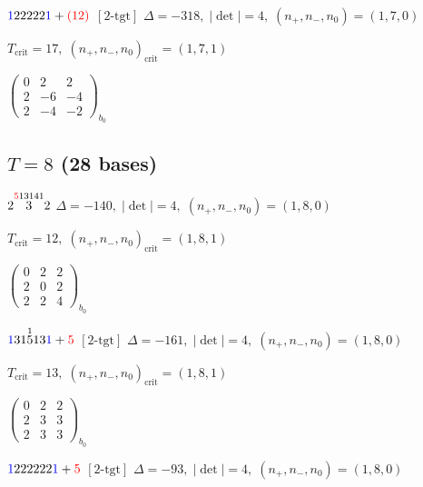 \documentclass[10pt]{article}
\begin{document}
$\textcolor{blue}{1}22222\textcolor{blue}{1}+\textcolor{red}{(12)}$ $\scriptstyle [2\text{-tgt}]$ \quad $\Delta=-318,\; |\det|=4,\; (n_+,n_-,n_0)=(1,7,0)$

\hspace{1em}$T_{\text{crit}}=17,\; (n_+,n_-,n_0)_{\text{crit}}=(1,7,1)$

\hspace{2em}$\left(\begin{smallmatrix}0 & 2 & 2 \\ 2 & -6 & -4 \\ 2 & -4 & -2\end{smallmatrix}\right)_{\!b_0}$


\subsection*{$T = 8$ \quad (28 bases)}
\smallskip

$2\overset{\textcolor{red}{5}13141}{3}2$ \quad $\Delta=-140,\; |\det|=4,\; (n_+,n_-,n_0)=(1,8,0)$

\hspace{1em}$T_{\text{crit}}=12,\; (n_+,n_-,n_0)_{\text{crit}}=(1,8,1)$

\hspace{2em}$\left(\begin{smallmatrix}0 & 2 & 2 \\ 2 & 0 & 2 \\ 2 & 2 & 4\end{smallmatrix}\right)_{\!b_0}$

\smallskip

$\textcolor{blue}{1}31\overset{1}{5}13\textcolor{blue}{1}+\textcolor{red}{5}$ $\scriptstyle [2\text{-tgt}]$ \quad $\Delta=-161,\; |\det|=4,\; (n_+,n_-,n_0)=(1,8,0)$

\hspace{1em}$T_{\text{crit}}=13,\; (n_+,n_-,n_0)_{\text{crit}}=(1,8,1)$

\hspace{2em}$\left(\begin{smallmatrix}0 & 2 & 2 \\ 2 & 3 & 3 \\ 2 & 3 & 3\end{smallmatrix}\right)_{\!b_0}$

\smallskip

$\textcolor{blue}{1}222222\textcolor{blue}{1}+\textcolor{red}{5}$ $\scriptstyle [2\text{-tgt}]$ \quad $\Delta=-93,\; |\det|=4,\; (n_+,n_-,n_0)=(1,8,0)$
\end{document}
